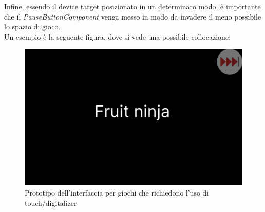 Infine, essendo il device target posizionato in un determinato modo, è importante che il \emph{PauseButtonComponent} venga messo in modo da invadere il meno possibile lo spazio di gioco.\\
Un esempio è la seguente figura, dove si vede una possibile collocazione:
\begin{figure}[h]
    \centering
    \includegraphics[width=340pt]{ProgettazioneTecnica/TouchDigitMockup.png}
    \caption{Prototipo dell'interfaccia per giochi che richiedono l'uso di touch/digitalizer}
    \label{fig:touchDigit}
\end{figure}
\newpage
